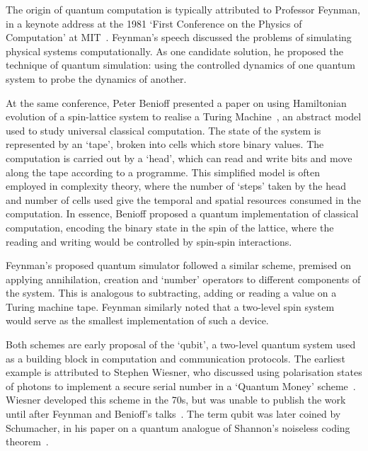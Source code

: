 \documentclass{standalone}
\begin{document}
The origin of quantum computation is typically attributed to Professor Feynman, in a keynote address at the 1981 `First Conference on the Physics of Computation' at MIT~\cite{Feynman1982}. Feynman's speech discussed the problems of simulating physical systems computationally. As one candidate solution, he proposed the technique of quantum simulation: using the controlled dynamics of one quantum system to probe the dynamics of another. 
\par
At the same conference, Peter Benioff presented a paper on using Hamiltonian evolution of a spin-lattice system to realise a Turing Machine~\cite{Benioff1986}, an abstract model used to study universal classical computation. The state of the system is represented by an `tape', broken into cells which store binary values. The computation is carried out by a `head', which can read and write bits and move along the tape according to a programme. This simplified model is often employed in complexity theory, where the number of `steps' taken by the head and number of cells used give the temporal and spatial resources consumed in the computation.  In essence, Benioff proposed a quantum implementation of classical computation, encoding the binary state in the spin of the lattice, where the reading and writing would be controlled by spin-spin interactions. 
\par
Feynman's proposed quantum simulator followed a similar scheme, premised on applying annihilation, creation and `number' operators to different components of the system. This is analogous to subtracting, adding or reading a value on a Turing machine tape. Feynman similarly noted that a two-level spin system would serve as the smallest implementation of such a device. 
\par
Both schemes are early proposal of the `qubit', a two-level quantum system used as a building block in computation and communication protocols. The earliest example is attributed to Stephen Wiesner, who discussed using polarisation states of photons to implement a secure serial number in a `Quantum Money' scheme~\cite{Wiesner1983}. Wiesner developed this scheme in the 70s, but was unable to publish the work until after Feynman and Benioff's talks~\cite{Brassard2006}. The term qubit was later coined by Schumacher, in his paper on a quantum analogue of Shannon's noiseless coding theorem~\cite{Schumacher1995a}.
\end{document}
